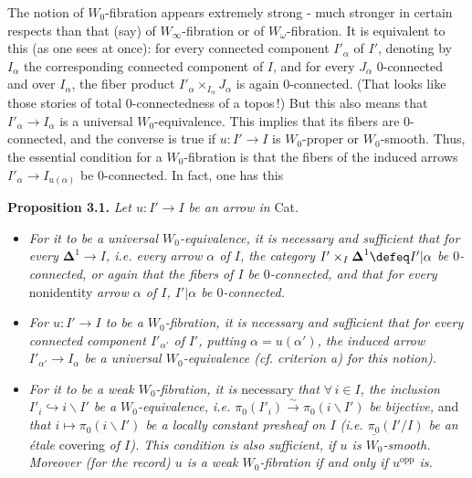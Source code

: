 The notion of $W_0$-fibration appears extremely strong - much stronger in certain respects than that (say) of $W_\infty$-fibration or of $W_\omega$-fibration. It is equivalent to this (as one sees at once): for every connected component $I'_\alpha$ of $I'$, denoting by $I_\alpha$ the corresponding connected component of $I$, and for every $J_\alpha$ 0-connected and over $I_\alpha$, the fiber product $I'_\alpha \times_{I_\alpha} J_\alpha$ is again 0-connected. (That looks like those stories of total 0-connectedness of a topos\,!) But this also means that $I'_\alpha \longrightarrow I_\alpha$ is a universal $W_0$-equivalence. This implies that its fibers are 0-connected, and the converse is true if $u : I' \longrightarrow I$ is $W_0$-proper or $W_0$-smooth. Thus, the essential condition for a $W_0$-fibration is that the fibers of the induced arrows $I'_\alpha \longrightarrow I_{u(\alpha)}$ be 0-connected. In fact, one has this

\noindent\textbf{Proposition 3.1.} \textit{Let $u : I' \longrightarrow I$ be an arrow in} Cat.
\begin{itemize}
\item[\textit{a)}] \textit{For it to be a universal $W_0$-equivalence, it is necessary and sufficient that for every $\boldsymbol{\Delta}^1 \longrightarrow I$, i.e. every arrow $\alpha$ of $I$, the category $I' \times_I \boldsymbol{\Delta}^1 \defeq I'|\alpha$ be $0$-connected, or again that the fibers of $I$ be $0$-connected, and that for every} nonidentity \textit{arrow $\alpha$ of $I$, $I'|\alpha$ be $0$-connected.}
\item[\textit{b)}] \textit{For $u : I' \longrightarrow I$ to be a $W_0$-fibration, it is necessary and sufficient that for every connected component $I'_{\alpha'}$ of}
\textit{$I'$, putting $\alpha = u(\alpha')$, the induced arrow $I'_{\alpha'} \longrightarrow I_\alpha$ be a universal $W_0$-equivalence (cf. criterion a) for this notion).}
\item[\textit{c)}] \textit{For it to be a weak $W_0$-fibration, it is} necessary \textit{that $\forall\, i \in I$, the inclusion $I'_i \hookrightarrow i\backslash I'$ be a $W_0$-equivalence, i.e. $\pi_0(I'_i) \xrightarrow{\;\sim\;} \pi_0(i\backslash I')$ be bijective,} and \textit{that $i \longmapsto \pi_0(i\backslash I')$ be a locally constant presheaf on $I$ (i.e. $\underline{\pi_0}(I'/I)$ be an étale} covering \textit{of $I$). This condition is also sufficient, if $u$ is $W_0$-smooth. Moreover (for the record) $u$ is a weak $W_0$-fibration if and only if $u^{\mathrm{opp}}$ is.}
\end{itemize}

